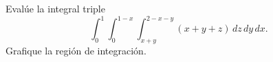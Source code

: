 Evalúe la integral triple
\[
\int_0^1\int_0^{1-x}\int_{x+y}^{2-x-y}(x+y+z)\,dz\,dy\,dx.
\]
Grafique la región de integración.

